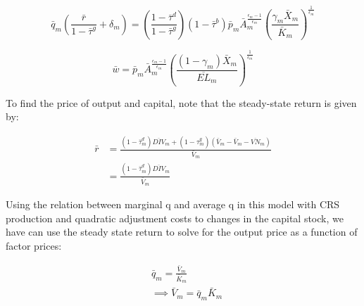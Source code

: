 \documentclass[letterpaper,12pt]{article}
\theoremstyle{definition}
\begin{document}
\begin{spacing}{1.5}
\begin{equation}
\bar{q}_{m}\left(\frac{\bar{r}}{1-\bar{\tau}^{g}}+\delta_{m}\right) = \left(\frac{1-\bar{\tau}^{d}}{1-\bar{\tau}^{g}}\right)(1-\bar{\tau}^{b})\bar{p}_{m}\bar{A}_{m}^{\frac{\epsilon_{m}-1}{\epsilon_{m}}}\left(\frac{\gamma_{m}\bar{X}_{m}}{\bar{K}_{m}}\right)^{\frac{1}{\epsilon_{m}}}
\end{equation}

\begin{equation}
\bar{w} = \bar{p}_{m}\bar{A}_{m}^{\frac{\epsilon_{m}-1}{\epsilon_{m}}}\left(\frac{(1-\gamma_{m})\bar{X}_{m}}{\overline{EL}_{m}} \right)^{\frac{1}{\epsilon_{m}}} 
\end{equation}

To find the price of output and capital, note that the steady-state return is given by:

\begin{equation}
\begin{split}
\bar{r} &= \frac{(1-\bar{\tau}^{d}_{m})\overline{DIV}_{m} + (1-\tau^{g}_{m})\left(\bar{V}_{m}-\bar{V}_{m}-\overline{VN}_{m}\right)}{\bar{V}_{m}}\\
& =  \frac{(1-\bar{\tau}^{d}_{m})\overline{DIV}_{m}}{\bar{V}_{m}}
\end{split}
\end{equation}

Using the relation between marginal q and average q in this model with CRS production and quadratic adjustment costs to changes in the capital stock, we have can use the steady state return to solve for the output price as a function of factor prices:

 \begin{equation}
\begin{split}
& \bar{q}_{m} = \frac{\bar{V}_{m}}{\bar{K}_{m}} \\
& \implies \bar{V}_{m} = \bar{q}_{m}\bar{K}_{m} \\
\end{split}
\end{equation}


\end{spacing}
\end{document}
